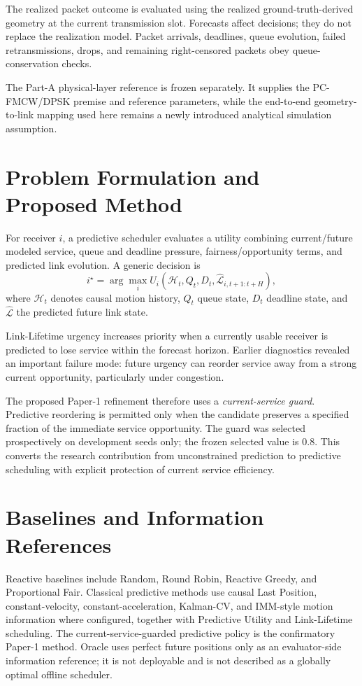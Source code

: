 \documentclass[conference]{IEEEtran}
\begin{document}
The realized packet outcome is evaluated using the realized ground-truth-derived geometry at the current transmission slot. Forecasts affect decisions; they do not replace the realization model. Packet arrivals, deadlines, queue evolution, failed retransmissions, drops, and remaining right-censored packets obey queue-conservation checks.

The Part-A physical-layer reference is frozen separately. It supplies the PC-FMCW/DPSK premise and reference parameters, while the end-to-end geometry-to-link mapping used here remains a newly introduced analytical simulation assumption.

\section{Problem Formulation and Proposed Method}
For receiver $i$, a predictive scheduler evaluates a utility combining current/future modeled service, queue and deadline pressure, fairness/opportunity terms, and predicted link evolution. A generic decision is
\begin{equation}
 i^{\star}=\arg\max_i U_i\!\left(\mathcal{H}_t,Q_t,D_t,\widehat{\mathcal{L}}_{i,t+1:t+H}\right),
\end{equation}
where $\mathcal{H}_t$ denotes causal motion history, $Q_t$ queue state, $D_t$ deadline state, and $\widehat{\mathcal{L}}$ the predicted future link state.

Link-Lifetime urgency increases priority when a currently usable receiver is predicted to lose service within the forecast horizon. Earlier diagnostics revealed an important failure mode: future urgency can reorder service away from a strong current opportunity, particularly under congestion.

The proposed Paper-1 refinement therefore uses a \emph{current-service guard}. Predictive reordering is permitted only when the candidate preserves a specified fraction of the immediate service opportunity. The guard was selected prospectively on development seeds only; the frozen selected value is 0.8. This converts the research contribution from unconstrained prediction to predictive scheduling with explicit protection of current service efficiency.

\section{Baselines and Information References}
Reactive baselines include Random, Round Robin, Reactive Greedy, and Proportional Fair. Classical predictive methods use causal Last Position, constant-velocity, constant-acceleration, Kalman-CV, and IMM-style motion information where configured, together with Predictive Utility and Link-Lifetime scheduling. The current-service-guarded predictive policy is the confirmatory Paper-1 method. Oracle uses perfect future positions only as an evaluator-side information reference; it is not deployable and is not described as a globally optimal offline scheduler.
\end{document}
